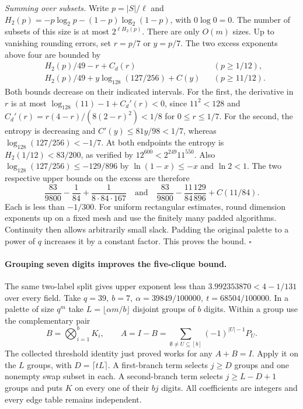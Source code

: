 \documentclass[11pt,letterpaper]{article}
\begin{document}
\emph{Summing over subsets.} Write \(p=|S|/\ell\) and
\(H_2(p)=-p\log_2 p-(1-p)\log_2(1-p)\), with \(0\log 0=0\).
The number of subsets of this size is at most \(2^{\ell H_2(p)}\).
There are only \(O(m)\) sizes. Up to vanishing rounding errors, set
\(r=p/7\) or \(y=p/7\). The two excess exponents above four are bounded by
\[
\begin{aligned}
 &H_2(p)/49-r+C_d(r) &&(p\ge1/12),\\
 &H_2(p)/49+y\log_{128}(127/256)+C(y) &&(p\ge11/12).
\end{aligned}
\]
Both bounds decrease on their indicated intervals. For the first, the
derivative in \(r\) is at most
\(\log_{128}(11)-1+C_d'(r)<0\), since \(11^2<128\) and
\(C_d'(r)=r(4-r)/(8(2-r)^2)<1/8\) for \(0\le r\le1/7\).
For the second, the entropy is decreasing and \(C'(y)\le81y/98<1/7\),
whereas \(\log_{128}(127/256)<-1/7\).
At both endpoints the entropy is \(H_2(1/12)<83/200\), as verified by
\(12^{600}<2^{249}11^{550}\). Also
\(\log_{128}(127/256)\le-129/896\) by \(\ln(1-x)\le-x\) and \(\ln 2<1\).
The two respective upper bounds on the excess are therefore
\[
 \frac{83}{9800}-\frac1{84}+\frac1{8\cdot84\cdot167}
 \quad\text{and}\quad
 \frac{83}{9800}-\frac{11}{84}\frac{129}{896}+C(11/84).
\]
Each is less than \(-1/300\). For uniform rectangular estimates, round
dimension exponents up on a fixed mesh and use the finitely many padded
algorithms. Continuity then allows arbitrarily small slack. Padding the
original palette to a power of \(q\) increases it by a constant factor.
This proves the bound. \hfill\(\square\)

\paragraph{Grouping seven digits improves the five-clique bound.}
The same two-label split gives upper exponent less than \(3.992353870<4-1/131\)
over every field. Take \(q=39,\ b=7,\ \alpha=39849/100000,\ t=68504/100000\).
In a palette of size \(q^m\) take \(L=\lfloor\alpha m/b\rfloor\) disjoint
groups of \(b\) digits. Within a group use the complementary pair
\[
 B=\bigotimes_{i=1}^b K_i,\qquad
 A=I-B=\sum_{\emptyset\ne U\subseteq[b]}(-1)^{|U|-1}P_U .
\]
The collected threshold identity just proved works for any \(A+B=I\).
Apply it on the \(L\) groups, with \(D=\lceil tL\rceil\).
A first-branch term selects \(j\ge D\) groups and one nonempty swap
subset in each. A second-branch term selects \(j\ge L-D+1\) groups
and puts \(K\) on every one of their \(bj\) digits. All coefficients
are integers and every edge table remains independent.
\end{document}
